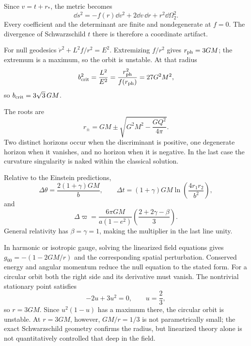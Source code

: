 \begin{solutions}
\begin{solution}
Since \(v=t+r_\ast\), the metric becomes
\[
\dd s^2=-f(r)\dd v^2+2\dd v\,\dd r+r^2\dd\Omega_2^2.
\]
Every coefficient and the determinant are finite and nondegenerate at
\(f=0\).  The divergence of Schwarzschild \(t\) there is therefore a
coordinate artifact.
\end{solution}

\begin{solution}
For null geodesics
\(\dot r^2+L^2f/r^2=E^2\).  Extremizing \(f/r^2\) gives
\(r_{\rm ph}=3GM\); the extremum is a maximum, so the orbit is unstable.
At that radius
\[
b_{\rm crit}^2=\frac{L^2}{E^2}
=\frac{r_{\rm ph}^2}{f(r_{\rm ph})}=27G^2M^2,
\]
so \(b_{\rm crit}=3\sqrt3\,GM\).
\end{solution}

\begin{solution}
The roots are
\[
r_\pm=GM\pm\sqrt{G^2M^2-\frac{GQ^2}{4\pi}}.
\]
Two distinct horizons occur when the discriminant is positive, one degenerate
horizon when it vanishes, and no horizon when it is negative.  In the last
case the curvature singularity is naked within the classical solution.
\end{solution}

\begin{solution}
Relative to the Einstein predictions,
\[
\Delta\theta=\frac{2(1+\gamma)GM}{b},\qquad
\Delta t=(1+\gamma)GM\ln\!\left(\frac{4r_1r_2}{b^2}\right),
\]
and
\[
\Delta\varpi
=\frac{6\pi GM}{a(1-e^2)}
\left(\frac{2+2\gamma-\beta}{3}\right).
\]
General relativity has \(\beta=\gamma=1\), making the multiplier in the last
line unity.
\end{solution}

\begin{solution}
In harmonic or isotropic gauge, solving the linearized field equations gives
\(g_{00}=-(1-2GM/r)\) and the corresponding spatial perturbation.  Conserved
energy and angular momentum reduce the null equation to the stated form.
For a circular orbit both the right side and its derivative must vanish.
The nontrivial stationary point satisfies
\[
-2u+3u^2=0,\qquad u=\frac23,
\]
so \(r=3GM\).  Since \(u^2(1-u)\) has a maximum there, the circular orbit is
unstable.  At \(r=3GM\), however, \(GM/r=1/3\) is not parametrically small;
the exact Schwarzschild geometry confirms the radius, but linearized theory
alone is not quantitatively controlled that deep in the field.
\end{solution}



\end{solutions}
